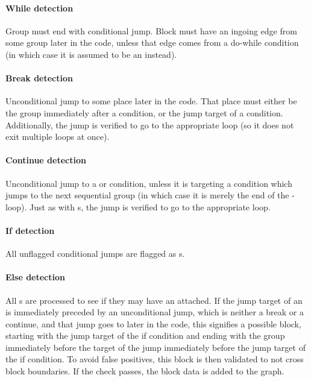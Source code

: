 \paragraph{While detection}
Group must end with conditional jump. Block must have an ingoing edge from some group later in the code, unless that edge comes from a do-while condition (in which case it is assumed to be an  instead).

\paragraph{Break detection}
Unconditional jump to some place later in the code. That place must either be the group immediately after a  condition, or the jump target of a  condition. Additionally, the jump is verified to go to the appropriate loop (so it does not exit multiple loops at once).

\paragraph{Continue detection}
Unconditional jump to a  or  condition, unless it is targeting a  condition which jumps to the next sequential group (in which case it is merely the end of the -loop). Just as with s, the jump is verified to go to the appropriate loop.

\paragraph{If detection}
All unflagged conditional jumps are flagged as s.

\paragraph{Else detection}
All s are processed to see if they may have an  attached. If the jump target of an  is immediately preceded by an unconditional jump, which is neither a break or a continue, and that jump goes to later in the code, this signifies a possible  block, starting with the jump target of the if condition and ending with the group immediately before the target of the jump immediately before the jump target of the if condition. To avoid false positives, this block is then validated to not cross block boundaries. If the check passes, the  block data is added to the graph.

